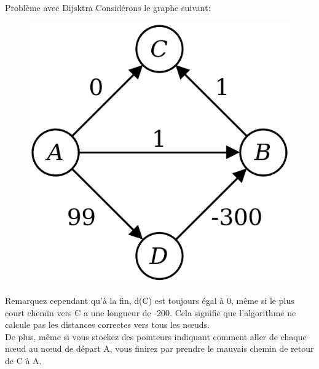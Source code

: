 \documentclass[10pt,xcolor=dvipsnames]{beamer}
\begin{document}
\begin{frame}{Problème avec Dijsktra}
    Considérons le graphe suivant:
\begin{minipage}{0.5\textwidth}
\begin{figure}
    \centering
    \includegraphics[scale=0.3]{figures/CM4/dji-neg.png}
    \label{fig:my_label}
\end{figure}
\end{minipage}\begin{minipage}{0.5\textwidth}
Remarquez cependant qu'à la fin, d(C) est toujours égal à 0, même si le plus court chemin vers C a une longueur de -200. Cela signifie que l'algorithme \alert{ne calcule pas} les distances correctes vers tous les nœuds.\\
De plus, même si vous stockez des pointeurs indiquant comment aller de chaque nœud au nœud de départ A, vous finirez par prendre le mauvais chemin de retour de C à A.
\end{minipage}
\end{frame}
\end{document}
